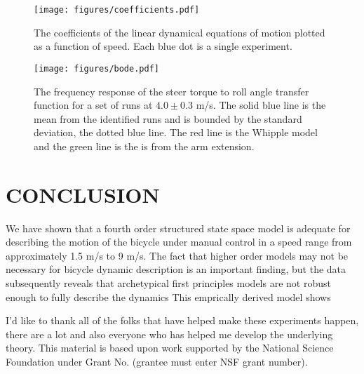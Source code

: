 \documentclass[twocolumn,10pt]{asme2e}
\begin{document}
\begin{figure*}
	\texttt{[image: figures/coefficients.pdf]}
	\caption{The coefficients of the linear dynamical equations of motion plotted
	as a function of speed. Each blue dot is a single experiment.}
	\label{fig:coefficients}
\end{figure*}

\begin{figure}
	\texttt{[image: figures/bode.pdf]}
	\caption{The frequency response of the steer torque to roll angle transfer
	function for a set of runs at $4.0 \pm 0.3$ m/s. The solid blue line is the
	mean from the identified runs and is bounded by the standard deviation, the
	dotted blue line. The red line is the Whipple model and the green line is the
	is from the arm extension.}
	\label{fig:bode}
\end{figure}

\section*{CONCLUSION}
We have shown that a fourth order structured state space model is adequate for
describing the motion of the bicycle under manual control in a speed range from
approximately 1.5 m/s to 9 m/s. The fact that higher order models may not be
necessary for bicycle dynamic description is an important finding, but the
data subsequently reveals that archetypical first principles models are not
robust enough to fully describe the dynamics This emprically derived model shows 

\begin{acknowledgment}
	I'd like to thank all of the folks that have helped make these experiments
	happen, there are a lot and also everyone who has helped me develop the
	underlying theory. This material is based upon work supported by the National
	Science Foundation under Grant No. (grantee must enter NSF grant number).
\end{acknowledgment}



\end{document}
